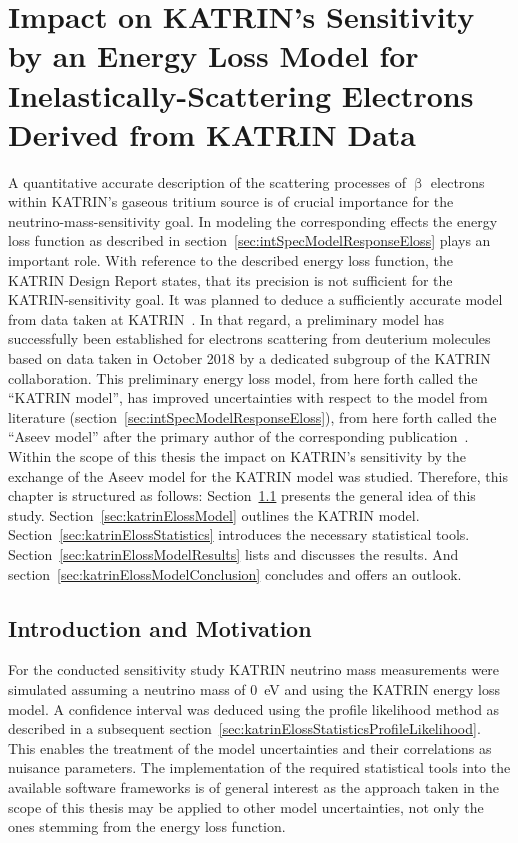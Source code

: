 \def\currentRootFolder{chapter/sensitivityStudyWithPreliminaryKatrinElossModel}
\def\currentFigureFolder{\currentRootFolder/fig}

\chapter{Impact on KATRIN's Sensitivity by an Energy Loss Model for Inelastically-Scattering Electrons Derived from KATRIN Data}
\label{sec:katrinEloss}
A quantitative accurate description of the scattering processes of $\upbeta$ electrons within KATRIN's gaseous tritium source is of crucial importance for the neutrino-mass-sensitivity goal. In modeling the corresponding effects the energy loss function as described in section~\ref{sec:intSpecModelResponseEloss} plays an important role. With reference to the described energy loss function, the KATRIN Design Report states, that its precision is not sufficient for the KATRIN-sensitivity goal. It was planned to deduce a sufficiently accurate model from data taken at KATRIN~\cite{Angrik:2005ep}. In that regard, a preliminary model has successfully been established for electrons scattering from deuterium molecules based on data taken in October 2018 by a dedicated subgroup of the KATRIN collaboration. This preliminary energy loss model, from here forth called the ``KATRIN model'', has improved uncertainties with respect to the model from literature (section~\ref{sec:intSpecModelResponseEloss}), from here forth called the ``Aseev model'' after the primary author of the corresponding publication~\cite{Aseev2000}. Within the scope of this thesis the impact on KATRIN's sensitivity by the exchange of the Aseev model for the KATRIN model was studied. Therefore, this chapter is structured as follows: Section~\ref{sec:katrinElossConcept} presents the general idea of this study. Section~\ref{sec:katrinElossModel} outlines the KATRIN model. Section~\ref{sec:katrinElossStatistics} introduces the necessary statistical tools. Section~\ref{sec:katrinElossModelResults} lists and discusses the results. And section~\ref{sec:katrinElossModelConclusion} concludes and offers an outlook.

\section{Introduction and Motivation}
\label{sec:katrinElossConcept}
For the conducted sensitivity study KATRIN neutrino mass measurements were simulated assuming a neutrino mass of \SI{0}{eV} and using the KATRIN energy loss model. A confidence interval was deduced using the profile likelihood method as described in a subsequent section~\ref{sec:katrinElossStatisticsProfileLikelihood}. This enables the treatment of the model uncertainties and their correlations as nuisance parameters. The implementation of the required statistical tools into the available software frameworks is of general interest as the approach taken in the scope of this thesis may be applied to other model uncertainties, not only the ones stemming from the energy loss function.

